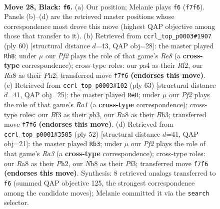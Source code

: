 \documentclass[11pt]{article}
\begin{document}
\clearpage

\begin{figure}[p]\centering
\begin{subfigure}{0.46\textwidth}\centering
\resizebox{\linewidth}{!}{%
\newchessgame
\chessboard[
  setfen={rn3k2/p4ppp/4p3/6RP/PP6/4Nb2/8/R1K5 b - - 0 28},
  showmover=false,
  pgfstyle=straightmove, color=movearrow, markmove={f7-f6}
]}
\caption{}
\end{subfigure}\hfill
\begin{subfigure}{0.46\textwidth}\centering
\resizebox{\linewidth}{!}{%
\newchessgame
\chessboard[
  setfen={4R3/pr3pp1/2pk4/7p/3r1P2/P5P1/1PK2R1P/8 w - - 2 31},
  showmover=false,
  pgfstyle=straightmove, color=movearrow, markmove={e8-h8}
]}
\caption{}
\end{subfigure}
\\[4pt]
\begin{subfigure}{0.46\textwidth}\centering
\resizebox{\linewidth}{!}{%
\newchessgame
\chessboard[
  setfen={r5k1/p4p2/p1R3p1/7p/8/1P5b/P4P2/3R2K1 b - - 1 32},
  showmover=false,
  pgfstyle=straightmove, color=movearrow, markmove={a8-e8}
]}
\caption{}
\end{subfigure}\hfill
\begin{subfigure}{0.46\textwidth}\centering
\resizebox{\linewidth}{!}{%
\newchessgame
\chessboard[
  setfen={r5k1/2p5/5bpp/p3p3/P7/R1P2PB1/1P5P/6K1 w - - 0 27},
  showmover=false,
  pgfstyle=straightmove, color=movearrow, markmove={a3-b3}
]}
\caption{}
\end{subfigure}
\caption{\textbf{Move 28, Black: \texttt{f6}.} (a) Our position; Melanie plays \texttt{f6} (\texttt{f7f6}). Panels (b)--(d) are the retrieved master positions whose correspondence most drove this move (highest QAP objective among those that transfer to it). (b) Retrieved from \texttt{ccrl\_top\_p0003\#1907} (ply 60) [structural distance $d$=43, QAP obj=28]: the master played \texttt{Rh8}; under $\mu$ our \emph{Pf2} plays the role of that game's \emph{Re8} (a \textbf{cross-type} correspondence); cross-type roles: our \emph{p}a4 as their \emph{R}f2, our \emph{R}a8 as their \emph{P}h2; transferred move \texttt{f7f6} \textbf{(endorses this move)}. (c) Retrieved from \texttt{ccrl\_top\_p0003\#102} (ply 63) [structural distance $d$=41, QAP obj=25]: the master played \texttt{Re8}; under $\mu$ our \emph{Pf2} plays the role of that game's \emph{Ra1} (a \textbf{cross-type} correspondence); cross-type roles: our \emph{B}f3 as their \emph{p}b3, our \emph{R}a8 as their \emph{B}h3; transferred move \texttt{f7f6} \textbf{(endorses this move)}. (d) Retrieved from \texttt{ccrl\_top\_p0001\#3505} (ply 52) [structural distance $d$=41, QAP obj=21]: the master played \texttt{Rb3}; under $\mu$ our \emph{Pf2} plays the role of that game's \emph{Ra3} (a \textbf{cross-type} correspondence); cross-type roles: our \emph{R}a8 as their \emph{P}h2, our \emph{N}b8 as their \emph{P}f3; transferred move \texttt{f7f6} \textbf{(endorses this move)}. Synthesis: 8 retrieved analogs transferred to \texttt{f6} (summed QAP objective 125, the strongest correspondence among the candidate moves); Melanie committed it via the \texttt{search} selector.}
\label{fig:thought-m55}
\end{figure}
\end{document}
